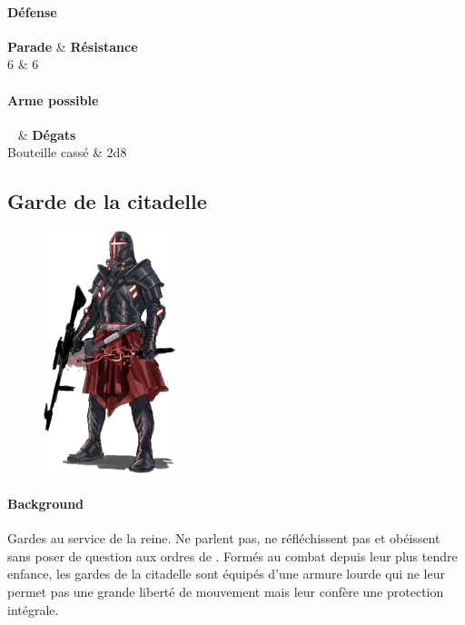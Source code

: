 \paragraph{Défense}
\begin{itemtable}[ c c ]
    \textbf{Parade}     & \textbf{Résistance} \\
    6                   & 6
\end{itemtable}

\paragraph{Arme possible}
\begin{itemtable}[ X c c ]
    ~                & \textbf{Dégats} \\
    Bouteille cassé  & 2d8
\end{itemtable}


\newpage

\subsection{Garde de la citadelle} \label{sec:citadel-guard}
\begin{figure}[h!]
    \centering
    \includegraphics[height=200pt]{_img/bestiary/citadel-guard.png}
\end{figure}
\paragraph{Background}
Gardes au service de la reine. Ne parlent pas, ne réfléchissent pas et obéissent sans poser de question aux ordres de . Formés au combat depuis leur plus tendre enfance, les gardes de la citadelle sont équipés d’une armure lourde qui ne leur permet pas une grande liberté de mouvement mais leur confère une protection intégrale.

